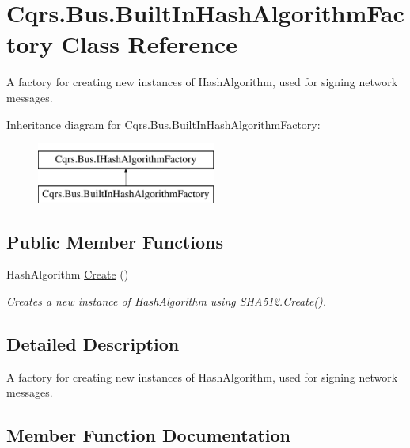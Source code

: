\hypertarget{classCqrs_1_1Bus_1_1BuiltInHashAlgorithmFactory}{}\section{Cqrs.\+Bus.\+Built\+In\+Hash\+Algorithm\+Factory Class Reference}
\label{classCqrs_1_1Bus_1_1BuiltInHashAlgorithmFactory}


A factory for creating new instances of Hash\+Algorithm, used for signing network messages.  


Inheritance diagram for Cqrs.\+Bus.\+Built\+In\+Hash\+Algorithm\+Factory\+:\begin{figure}[H]
\begin{center}
\leavevmode
\includegraphics[height=2.000000cm]{classCqrs_1_1Bus_1_1BuiltInHashAlgorithmFactory}
\end{center}
\end{figure}
\subsection*{Public Member Functions}
\begin{DoxyCompactItemize}
\item 
Hash\+Algorithm \hyperlink{classCqrs_1_1Bus_1_1BuiltInHashAlgorithmFactory_adbfcb13cf0ffe18e405bc6a50f0642f4_adbfcb13cf0ffe18e405bc6a50f0642f4}{Create} ()
\begin{DoxyCompactList}\small\item\em Creates a new instance of Hash\+Algorithm using S\+H\+A512.\+Create(). \end{DoxyCompactList}\end{DoxyCompactItemize}


\subsection{Detailed Description}
A factory for creating new instances of Hash\+Algorithm, used for signing network messages. 



\subsection{Member Function Documentation}
\mbox{\label{classCqrs_1_1Bus_1_1BuiltInHashAlgorithmFactory_adbfcb13cf0ffe18e405bc6a50f0642f4_adbfcb13cf0ffe18e405bc6a50f0642f4}} 
